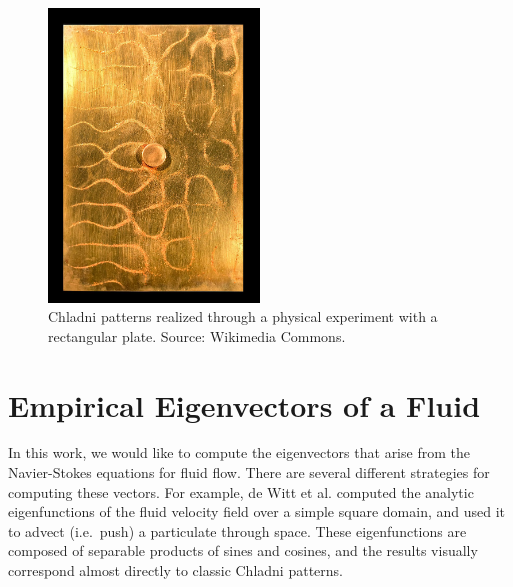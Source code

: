 \documentclass[11pt]{article}
\begin{document}
\begin{figure}
		\centering
		\includegraphics[angle=90,origin=c, width=0.5\textwidth]{Figures/chladni_plate.jpg}
		\vspace*{-2em}
		\caption{Chladni patterns realized through a physical experiment with a rectangular plate. Source: Wikimedia Commons.}
		\label{fig:chladni-plate}
\end{figure}

\section*{Empirical Eigenvectors of a Fluid}

In this work, we would like to compute the eigenvectors that arise from the Navier-Stokes equations for fluid flow. There are several different strategies for computing these vectors. For example, de Witt et al. \cite{deWitt:2012} computed the analytic eigenfunctions of the fluid velocity field over a simple square domain, and used it to advect (i.e.~push) a particulate through space. These eigenfunctions are composed of separable products of sines and cosines, and the results visually correspond almost directly to classic Chladni patterns. 
\end{document}
